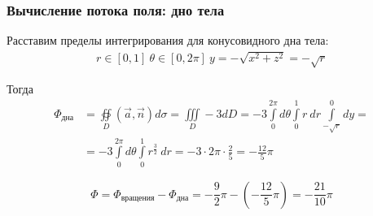 \begin{frame}\frametitle{Вычисление потока поля: дно тела}

	Расставим пределы интегрирования для конусовидного дна тела:
	\begin{align*}
		r \in [0,1] \
		\theta \in [0, 2\pi] \
		y = -\sqrt{x^2 + z^2} = -\sqrt{r}
	\end{align*}

	Тогда
	\begin{align*}
		\Phi_{\text{дна}}
		 & =  \oiint\limits_{D}\left( \vec {a}, \vec {n} \right) d\sigma = \iiint\limits_D -3 dD
		= -3 \int\limits_{0}^{2 \pi} d \theta
		\int\limits_{0}^{1} r~dr
		\int\limits_{-\sqrt{r}}^{0} dy =                                                         \\
		 & = -3 \int\limits_{0}^{2 \pi} d \theta
		\int\limits_{0}^{1}r^{\frac{3}{2}}~dr
		= -3 \cdot 2 \pi \cdot \frac{2}{5} = - \frac{12}{5} \pi
	\end{align*}

	\begin{equation*}
		\Phi =
		\Phi_{\text{вращения}} - \Phi_{\text{дна}} =
		-\frac{9}{2}\pi - \left(- \frac{12}{5} \pi\right) = - \frac{21}{10} \pi
	\end{equation*}
\end{frame}
